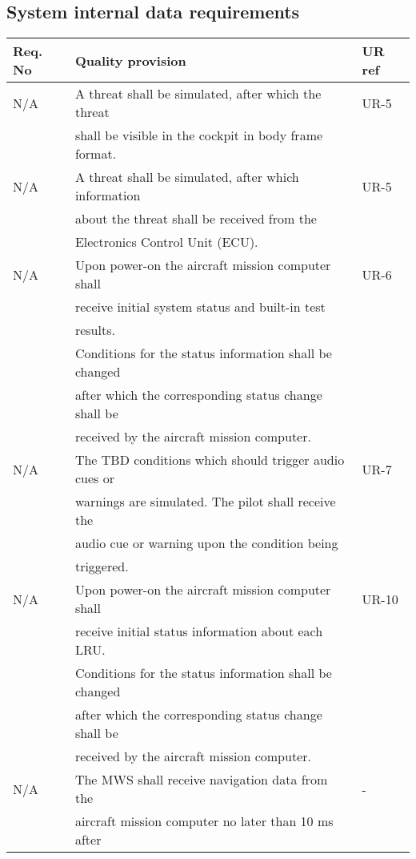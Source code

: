 \subsection{System internal data requirements}
\begin{center}
    \begin{tabular}{ | l | l | l |}
    \hline	  
    Req. No & Quality provision  									& UR ref \\ \hline
		N/A & A threat shall be simulated, after which the threat 	& UR-5 \\
			& shall be visible in the cockpit in body frame format. & \\ \hline
		N/A & A threat shall be simulated, after which information	& UR-5 \\
			& about the threat shall be received from the 			&\\
			& Electronics Control Unit (ECU). 						&\\ \hline
		N/A & Upon power-on the aircraft mission computer shall 	& UR-6 \\
			& receive initial system status and built-in test 		&\\
			& results.												&\\ 	
			& Conditions for the status information shall be changed&\\
			& after which the corresponding status change shall be  &\\
			& received by the aircraft mission computer. 			&\\ \hline
		N/A & The TBD conditions which should trigger audio cues or & UR-7 \\
			& warnings are simulated. The pilot shall receive the  	&\\
			& audio cue or warning upon the condition being  		&\\				
			& triggered.											&\\ \hline
		N/A & Upon power-on the aircraft mission computer shall  	& UR-10 \\
			& receive initial status information about each LRU. 	& \\
			& Conditions for the status information shall be changed&\\
			& after which the corresponding status change shall be 	&\\
			& received by the aircraft mission computer. 			&\\ \hline
		N/A & The MWS shall receive navigation data from the 		& - \\
			& aircraft mission computer no later than 10 ms after 	&\\

\end{tabular}
\end{center}
